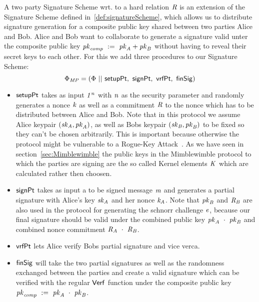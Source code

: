 \begin{definition}
    \label{def:twoPartySig}
    A two party Signature Scheme wrt. to a hard relation $\mathit{R}$ is an extension of the Signature Scheme defined in~\ref{def:signatureScheme}, which allows us to distribute signature generation for a composite public key shared between two parties Alice and Bob.
    Alice and Bob want to collaborate to generate a signature valid unter the composite public key $\mathit{pk}_{\mathit{comp}} ~:=~ \mathit{pk}_{\mathit{A}} + \mathit{pk}_{\mathit{B}}$ without having to reveal their secret keys to each other. For this we add three procedures to our Signature Scheme:
    \[ \Phi_{\mathit{MP}} = (\Phi ~||~ \mathsf{setupPt} ,~ \mathsf{signPt} ,~ \mathsf{vrfPt} ,~ \mathsf{finSig}) \]
    \begin{itemize}
        \item $\mathsf{setupPt}$ takes as input $\mathit{1^n}$ with $\mathit{n}$ as the security parameter and randomly generates a nonce $\mathit{k}$ as well as a commitment $\mathit{R}$ to the nonce which has to be distributed between Alice and Bob.
               Note that in this protocol we assume Alice keypair $(\mathit{sk}_{\mathit{A}}, \mathit{pk}_{\mathit{A}})$, as well as Bobs keypair $(\mathit{sk}_{\mathit{B}}, \mathit{pk}_{\mathit{B}})$ to be fixed so they can't be chosen arbitrarily. This is important because otherwise the protocol might be vulnerable to a
               Rogue-Key Attack~\cite{horster1995meta}. As we have seen in section~\ref{sec:Mimblewimble} the public keys in the Mimblewimble protocol to which the parties are signing are the so called Kernel elements $\mathit{K}$ which are calculated rather then choosen.
        \item $\mathsf{signPt}$ takes as input a to be signed message $\mathit{m}$ and generates a partial signature with Alice's key $\mathit{sk}_{\mathit{A}}$ and her nonce $\mathit{\mathit{k}_{\mathit{A}}}$. Note that $\mathit{pk}_{\mathit{B}}$ and $\mathit{R}_{\mathit{B}}$ are also used in the protocol
               for generating the schnorr challenge $\mathit{e}$, because our final signature should be valid under the combined public key $\mathit{pk}_{\mathit{A}} ~\cdot~ \mathit{pk}_{\mathit{B}}$ and combined nonce commitment $\mathit{R}_{\mathit{A}} ~\cdot~ \mathit{R}_{\mathit{B}}$.
        \item $\mathsf{vrfPt}$ lets Alice verify Bobs partial signature and vice verca.
        \item $\mathsf{finSig}$ will take the two partial signatures as well as the randomness exchanged between the parties and create a valid signature which can be verified with the regular $\mathsf{Verf}$ function under the composite public key
        $\mathit{pk}_{\mathit{comp}} ~:=~ \mathit{pk}_{\mathit{A}} ~\cdot~ \mathit{pk}_{\mathit{B}}$.
    \end{itemize}
\end{definition}


